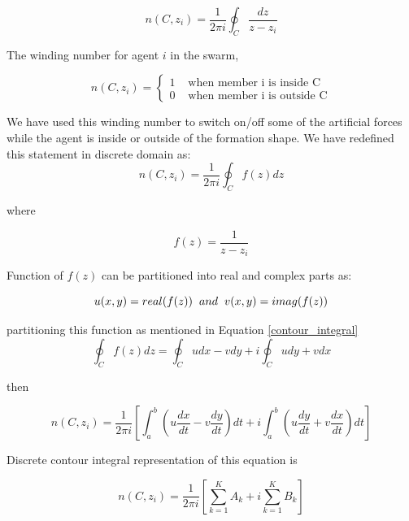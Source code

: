 \begin{equation}
 n(C,z_i) = \frac{1}{2\pi i}\oint_C \frac{dz}{z-z_i}
\end{equation}
		
The winding number for agent $i$ in the swarm,

\begin{equation}
n(C,z_i) = \left\{ \begin{array}{rl}
1 &\mbox{ when member i is inside C} \\
0 &\mbox{ when member i is outside C}
\end{array} \right.
\end{equation}

We have used this winding number to switch on/off some of the artificial forces while the agent is inside or outside of the formation shape. We have redefined this statement in discrete domain as:
\begin{equation}
n(C,z_i) = \frac{1}{2\pi i} \oint_C f(z)dz
\end{equation}

where 

\begin{equation}
f(z) = \frac{1}{z-z_i}
\end{equation}
		
Function of $f(z)$ can be partitioned into real and complex parts as:

\begin{equation}
u(x,y) = real(f(z))  \hspace{0.2cm} and \hspace{0.2cm} v(x,y) = imag(f(z))
\end{equation}
		
partitioning this function as mentioned in Equation \ref{contour_integral}
\begin{equation}
\oint_C f(z)dz  = \oint_C u dx - v dy + i \oint_C u dy + v dx 
\end{equation}

then

\begin{equation}
n(C,z_i)  = \frac{1}{2\pi i} \left[\int_{a}^{b} \left(u\frac{dx}{dt} - v\frac{dy}{dt}\right)dt + i\int_{a}^{b}\left(u\frac{dy}{dt} + v\frac{dx}{dt}\right)dt\right]
\end{equation}
		
Discrete contour integral representation of this equation is
		
\begin{equation}
n(C,z_i)  = \frac{1}{2\pi i} {\left[\sum_{k=1}^{K} {A_k} + i\sum_{k=1}^{K} {B_k}\right]}
\end{equation}

